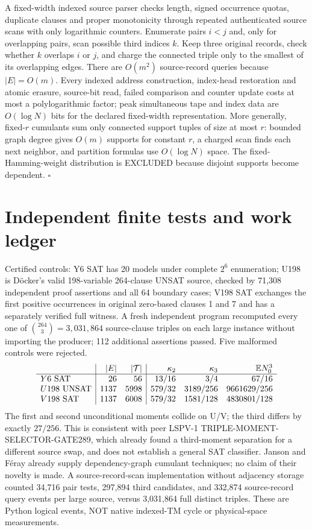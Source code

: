 \documentclass[11pt]{article}
\begin{document}
A fixed-width indexed source parser checks length, signed occurrence quotas, duplicate clauses and proper monotonicity through repeated authenticated source scans with only logarithmic counters. Enumerate pairs $i<j$ and, only for overlapping pairs, scan possible third indices $k$. Keep three original records, check whether $k$ overlaps $i$ or $j$, and charge the connected triple only to the smallest of its overlapping edges. There are $O(m^2)$ source-record queries because $|E|=O(m)$. Every indexed address construction, index-head restoration and atomic erasure, source-bit read, failed comparison and counter update costs at most a polylogarithmic factor; peak simultaneous tape and index data are $O(\log N)$ bits for the declared fixed-width representation. More generally, fixed-$r$ cumulants sum only connected support tuples of size at most $r$: bounded graph degree gives $O(m)$ supports for constant $r$, a charged scan finds each next neighbor, and partition formulas use $O(\log N)$ space. The fixed-Hamming-weight distribution is EXCLUDED because disjoint supports become dependent. \hfill$\square$

\section*{Independent finite tests and work ledger}
Certified controls: Y6 SAT has 20 models under complete $2^6$ enumeration; U198 is D\"ocker's valid 198-variable 264-clause UNSAT source, checked by 71,308 independent proof assertions and all 64 boundary cases; V198 SAT exchanges the first positive occurrences in original zero-based clauses 1 and 7 and has a separately verified full witness. A fresh independent program recomputed every one of $\binom{264}3=3,031,864$ source-clause triples on each large instance without importing the producer; 112 additional assertions passed. Five malformed controls were rejected.
\[
\begin{array}{l|rr|rrr}
 & |E| & |\mathcal T| & \kappa_2 & \kappa_3 & \mathbb EN_0^3\\\hline
Y6\ {\rm SAT}&26&56&13/16&3/4&67/16\\
U198\ {\rm UNSAT}&1137&5998&579/32&3189/256&9661629/256\\
V198\ {\rm SAT}&1137&6008&579/32&1581/128&4830801/128
\end{array}
\]
The first and second unconditional moments collide on U/V; the third differs by exactly $27/256$. This is consistent with peer LSPV-1 TRIPLE-MOMENT-SELECTOR-GATE289, which already found a third-moment separation for a different source swap, and does not establish a general SAT classifier. Janson and F\'eray already supply dependency-graph cumulant techniques; no claim of their novelty is made. A source-record-scan implementation without adjacency storage counted 34,716 pair tests, 297,894 third candidates, and 332,874 source-record query events per large source, versus 3,031,864 full distinct triples. These are Python logical events, NOT native indexed-TM cycle or physical-space measurements.
\end{document}
